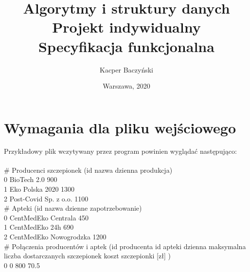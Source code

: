 \documentclass{article}
\title{Algorytmy i struktury danych
\\Projekt indywidualny\\
\bigbreak
Specyfikacja funkcjonalna}
\author{Kacper Baczyński}
\date{Warszawa, 2020}
\begin{document}
\maketitle

\section{Wymagania dla pliku wejściowego}
Przykładowy plik wczytywany przez program powinien wyglądać następująco:\\\\
# Producenci szczepionek (id \textbar\vspace{} nazwa \textbar\vspace{} dzienna produkcja)\\
0 \textbar\vspace{} BioTech 2.0 \textbar\vspace{} 900\\
1 \textbar\vspace{} Eko Polska 2020 \textbar\vspace{} 1300\\
2 \textbar\vspace{} Post-Covid Sp. z o.o. \textbar\vspace{} 1100\\
# Apteki (id \textbar\vspace{} nazwa \textbar\vspace{} dzienne zapotrzebowanie)\\
0 \textbar\vspace{} CentMedEko Centrala \textbar\vspace{} 450\\
1 \textbar\vspace{} CentMedEko 24h \textbar\vspace{} 690\\
2 \textbar\vspace{} CentMedEko Nowogrodzka \textbar\vspace{} 1200\\
# Połączenia producentów i aptek (id producenta \textbar\vspace{} id apteki \textbar\vspace{} dzienna maksymalna liczba dostarczanych szczepionek \textbar\vspace{} koszt szczepionki [zł] )\\
0 \textbar\vspace{} 0 \textbar\vspace{} 800 \textbar\vspace{} 70.5\\
\end{document}
